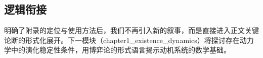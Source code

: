 \documentclass[../main.tex]{subfiles}
\begin{document}
	\subsection{逻辑衔接}
		明确了附录的定位与使用方法后，我们不再引入新的叙事，而是直接进入正文关键论断的形式化展开。下一模块（chapter1\_existence\_dynamics）将探讨存在动力学中的演化稳定性条件，用博弈论的形式语言揭示动机系统的数学基础。
	
	
	
\end{document}
